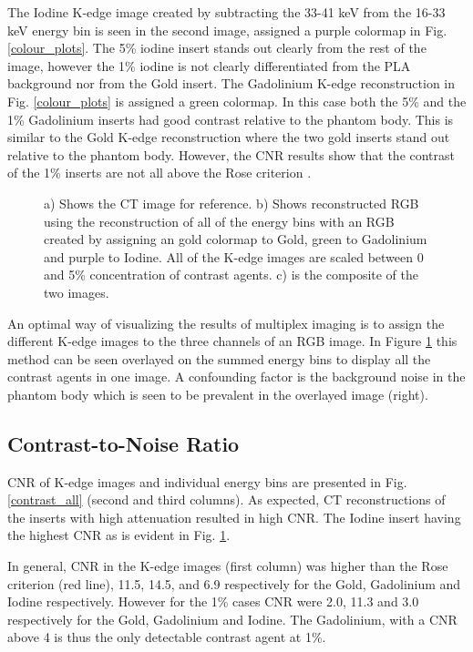 \documentclass[journal, a4paper]{IEEEtran}
\begin{document}
The Iodine K-edge image created by subtracting the 33-41 keV from the 16-33 keV energy bin is seen in the second image, assigned a purple colormap in Fig. \ref{colour_plots}. The 5\% iodine insert stands out clearly from the rest of the image, however the 1\% iodine is not clearly differentiated from the PLA background nor from the Gold insert. The Gadolinium K-edge reconstruction in Fig. \ref{colour_plots} is assigned a green colormap. In this case both the 5\% and the 1\% Gadolinium inserts had good contrast relative to the phantom body. This is similar to the Gold K-edge reconstruction where the two gold inserts stand out relative to the phantom body. However, the CNR results show that the contrast of the 1\% inserts are not all above the Rose criterion \cite{rose}.

\begin{figure}[h!]
\centering
{}

\caption{a) Shows the CT image for reference. b) Shows reconstructed RGB using the reconstruction of all of the energy bins with an RGB created by assigning an gold colormap to Gold, green to Gadolinium and purple to Iodine. All of the K-edge images are scaled between 0 and 5\% concentration of contrast agents. c) is the composite of the two images.}
\label{rgb_image}

\end{figure}

An optimal way of visualizing the results of multiplex imaging is to assign the different K-edge images to the three channels of an RGB image. In Figure \ref{rgb_image} this method can be seen overlayed on the summed energy bins to display all the contrast agents in one image. A confounding factor is the background noise in the phantom body which is seen to be prevalent in the overlayed image (right).

\subsection{Contrast-to-Noise Ratio}

CNR of K-edge images and individual energy bins are presented in Fig. \ref{contrast_all} (second and third columns). As expected, CT reconstructions of the inserts with high attenuation resulted in high CNR. The Iodine insert having the highest CNR as is evident in Fig. \ref{rgb_image}.

In general, CNR in the K-edge images (first column) was higher than the Rose criterion (red line), 11.5, 14.5, and 6.9 respectively for the Gold, Gadolinium and Iodine respectively. However for the 1\% cases CNR were 2.0, 11.3 and 3.0 respectively for the Gold, Gadolinium and Iodine. The Gadolinium, with a CNR above 4 is thus the only detectable contrast agent at 1\%.
\end{document}
